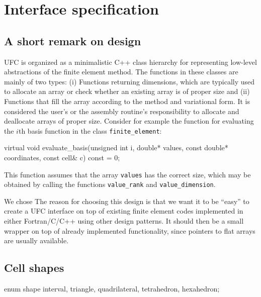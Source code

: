 \chapter{Interface specification}
\label{sec:interface}


\section{A short remark on design}

UFC is organized as a minimalistic C++ class hierarchy
for representing low-level abstractions of the finite 
element method. The functions in these classes are mainly of
two types: (i) Functions returning dimensions, which are typically 
used to allocate an array or check whether an existing array is of
proper size and (ii) Functions that fill the array according to 
the method and variational form. It is considered the user's or
the assembly routine's responsibility to allocate and 
deallocate arrays of proper size. 
Consider for example the function for evaluating the $i$th basis function 
in the class \texttt{finite\_element}:
\begin{code}
virtual void evaluate_basis(unsigned int i, double* values,
                            const double* coordinates,
                            const cell& c) const = 0;
\end{code}
This function assumes that the array \texttt{values} has the 
correct size, which may be obtained by calling the functions
\texttt{value\_rank} and \texttt{value\_dimension}.

We chose The reason for choosing this design is that we want it
to be ``easy'' to create a UFC interface on top of existing finite
element codes implemented in either Fortran/C/C++
using other design patterns. It 
should then be a small wrapper on top of already implemented
functionality, since pointers to flat arrays are usually available.

\section{Cell shapes}


\begin{code}
enum shape {interval,
            triangle, quadrilateral,
            tetrahedron, hexahedron};
\end{code}

